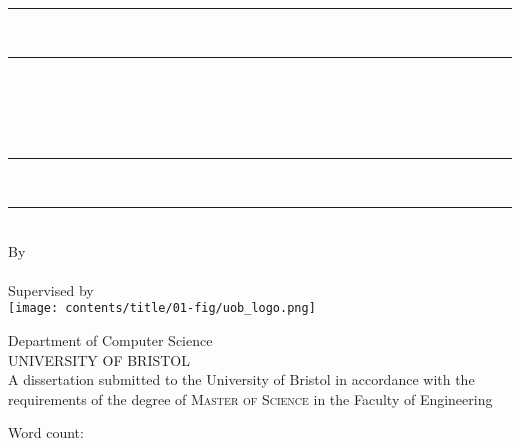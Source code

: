 \begin{titlepage}
    \centering

    \vspace*{2.2cm}

    \rule{\textwidth}{2pt} \\[-2ex]
    \rule{\textwidth}{0.5pt} \\[0.7cm]

    {\LARGE\bfseries \myReportTitle} \\[0.3cm]

    \parbox{0.89\textwidth}{\centering
        {\large \textit{\myReportSubtitle}}
    } \\[0.3cm]

    \rule{\textwidth}{0.5pt} \\[-2ex]
    \rule{\textwidth}{2pt} \\[0.3cm]

    {\large By} \\[0.3cm]
    {\large \myName} \\[0.3cm]
    {\normalsize Supervised by \mySupervisor} \\[1cm]

    \texttt{[image: contents/title/01-fig/uob\_logo.png]} \\[1cm]

    \begin{minipage}{0.65\textwidth}
        \centering
        {\Large Department of Computer Science} \\[0.3cm]
        {\Large \textsc{UNIVERSITY OF BRISTOL}} \\[1cm]
        {\normalsize A dissertation submitted to the University of Bristol
        in accordance with the requirements of the degree of \textsc{Master of Science}
        in the Faculty of Engineering} \\[1cm]
        {\large \mySubmissionMonthYear}
    \end{minipage}

    \vspace*{1cm}


    \begin{flushright}
        Word count: \wordCount
    \end{flushright}

    \vspace*{2.2cm}

\end{titlepage}